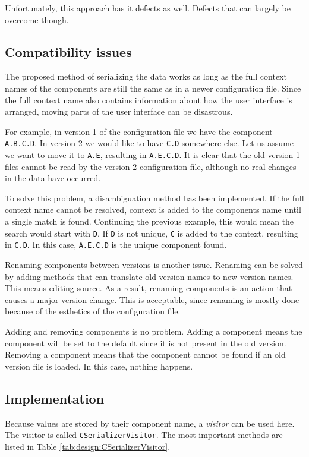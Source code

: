 Unfortunately, this approach has it defects as well. Defects that can largely
be overcome though.

\subsection{Compatibility issues}
The proposed method of serializing the data works as long as the full context
names of the components are still the same as in a newer configuration file.
Since the full context name also contains information about how the user
interface is arranged, moving parts of the user interface can be disastrous.

For example, in version 1 of the configuration file we have the component
\verb=A.B.C.D=. In version 2 we would like to have \verb=C.D= somewhere else.
Let us assume we want to move it to \verb=A.E=, resulting in \verb=A.E.C.D=. It
is clear that the old version 1 files cannot be read by the version 2
configuration file, although no real changes in the data have occurred.

To solve this problem, a disambiguation method has been implemented. If the
full context name cannot be resolved, context is added to the components name
until a single match is found. Continuing the previous example, this would mean
the search would start with \verb=D=. If \verb=D= is not unique, \verb=C= is
added to the context, resulting in \verb=C.D=. In this case, \verb=A.E.C.D= is
the unique component found.

\bigskip \noindent
Renaming components between versions is another issue. Renaming can be solved
by adding methods that can translate old version names to new version names.
This means editing source. As a result, renaming components is an action that
causes a major version change. This is acceptable, since renaming is mostly
done because of the esthetics of the configuration file.

Adding and removing components is no problem. Adding a component means the
component will be set to the default since it is not present in the old
version. Removing a component means that the component cannot be found if an
old version file is loaded. In this case, nothing happens.

\subsection{Implementation}
Because values are stored by their component name, a \emph{visitor} can be used
here. The visitor is called \verb=CSerializerVisitor=. The most important
methods are listed in Table \ref{tab:design:CSerializerVisitor}.

